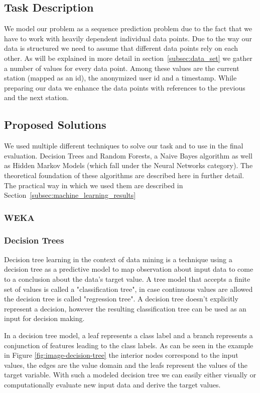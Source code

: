 \subsection{Task Description}
\label{subsec:task_description}
We model our problem as a sequence prediction problem due to the fact that we have to work with heavily dependent individual data points. Due to the way our data is structured we need to assume that different data points rely on each other. As will be explained in more detail in section~\ref{subsec:data_set} we gather a number of values for every data point. Among these values are the current station (mapped as an id), the anonymized user id and a timestamp. While preparing our data we enhance the data points with references to the previous and the next station.


\subsection{Proposed Solutions}
\label{subsec:proposed_solution}
We used multiple different techniques to solve our task and to use in the final evaluation. Decision Trees and Random Forests, a Naive Bayes algorithm as well as Hidden Markov Models (which fall under the Neural Networks category). The theoretical foundation of these algorithms are described here in further detail. The practical way in which we used them are described in Section~\ref{subsec:machine_learning_results}

\subsubsection{WEKA}

\subsubsection{Decision Trees}
Decision tree learning in the context of data mining is a technique using a decision tree as a predictive model to map observation about input data to come to a conclusion about the data's target value. A tree model that accepts a finite set of values is called a "classification tree", in case continuous values are allowed the decision tree is called "regression tree". A decision tree doesn't explicitly represent a decision, however the resulting classification tree can be used as an input for decision making. 

In a decision tree model, a leaf represents a class label and a branch represents a conjunction of features leading to the class labels. As can be seen in the example in Figure \ref{fig:image-decision-tree} the interior nodes correspond to the input values, the edges are the value domain and the leafs represent the values of the target variable. With such a modeled decision tree we can easily either visually or computationally evaluate new input data and derive the target values.

